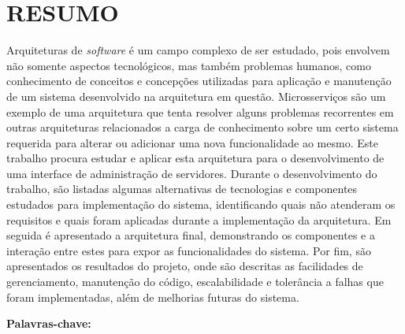 \chapter*{RESUMO}

\noindent Arquiteturas de \emph{software} é um campo complexo de ser estudado,
pois envolvem não somente aspectos tecnológicos, mas também problemas
humanos, como conhecimento de conceitos e concepções utilizadas para
aplicação e manutenção de um sistema desenvolvido na arquitetura em questão.
Microsserviços são um exemplo de uma arquitetura que tenta resolver alguns
problemas recorrentes em outras arquiteturas relacionados a carga de
conhecimento sobre um certo sistema requerida para alterar ou adicionar uma
nova funcionalidade ao mesmo. Este trabalho procura estudar e aplicar esta
arquitetura para o desenvolvimento de uma interface de administração de
servidores. Durante o desenvolvimento do trabalho, são listadas algumas
alternativas de tecnologias e componentes estudados para implementação
do sistema, identificando quais não atenderam os requisitos e quais
foram aplicadas durante a implementação da arquitetura. Em seguida é
apresentado a arquitetura final, demonstrando os componentes e a
interação entre estes para expor as funcionalidades do sistema. Por
fim, são apresentados os resultados do projeto, onde são descritas as
facilidades de gerenciamento, manutenção do código, escalabilidade e
tolerância a falhas que foram implementadas, além de melhorias futuras
do sistema.

\newline\newline\noindent \textbf{Palavras-chave:} \ptBRKeyword
